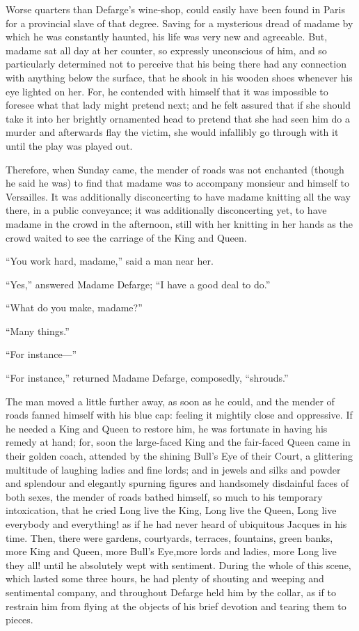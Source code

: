 Worse quarters than Defarge's wine-shop, could easily have been found
in Paris for a provincial slave of that degree.  Saving for a mysterious
dread of madame by which he was constantly haunted, his life was very
new and agreeable.  But, madame sat all day at her counter, so expressly
unconscious of him, and so particularly determined not to perceive that
his being there had any connection with anything below the surface,
that he shook in his wooden shoes whenever his eye lighted on her.
For, he contended with himself that it was impossible to foresee what
that lady might pretend next; and he felt assured that if she should
take it into her brightly ornamented head to pretend that she had seen
him do a murder and afterwards flay the victim, she would infallibly
go through with it until the play was played out.

Therefore, when Sunday came, the mender of roads was not enchanted
(though he said he was) to find that madame was to accompany monsieur
and himself to Versailles.  It was additionally disconcerting to have
madame knitting all the way there, in a public conveyance; it was
additionally disconcerting yet, to have madame in the crowd in the
afternoon, still with her knitting in her hands as the crowd waited
to see the carriage of the King and Queen.

``You work hard, madame,'' said a man near her.

``Yes,'' answered Madame Defarge; ``I have a good deal to do.''

``What do you make, madame?''

``Many things.''

``For instance---''

``For instance,'' returned Madame Defarge, composedly, ``shrouds.''

The man moved a little further away, as soon as he could, and the
mender of roads fanned himself with his blue cap:  feeling it mightily
close and oppressive.  If he needed a King and Queen to restore him,
he was fortunate in having his remedy at hand; for, soon the large-faced
King and the fair-faced Queen came in their golden coach, attended by
the shining Bull's Eye of their Court, a glittering multitude of
laughing ladies and fine lords; and in jewels and silks and powder and
splendour and elegantly spurning figures and handsomely disdainful faces
of both sexes, the mender of roads bathed himself, so much to his
temporary intoxication, that he cried Long live the King, Long live
the Queen, Long live everybody and everything! as if he had never
heard of ubiquitous Jacques in his time.  Then, there were gardens,
courtyards, terraces, fountains, green banks, more King and Queen,
more Bull's Eye,more lords and ladies, more Long live they all! until
he absolutely wept with sentiment.  During the whole of this scene,
which lasted some three hours, he had plenty of shouting and weeping
and sentimental company, and throughout Defarge held him by the collar,
as if to restrain him from flying at the objects of his brief devotion
and tearing them to pieces.

